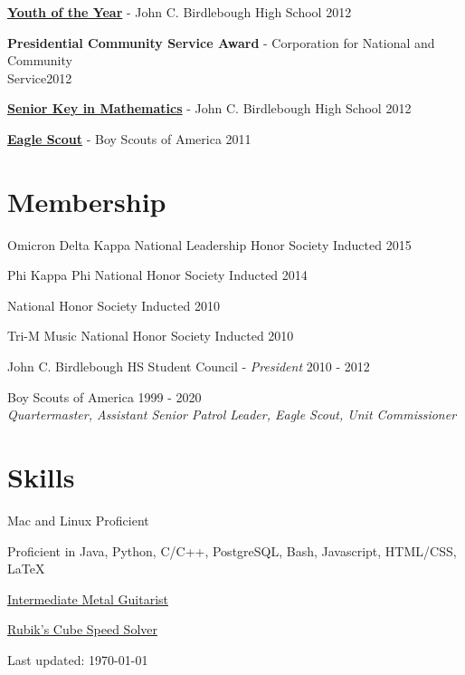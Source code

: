 \documentclass[8pt]{article}
\def\footerlink{}
\renewenvironment{itemize}{
  \begin{list}{}{
    \setlength{\leftmargin}{1.5em}
  }
}{
  \end{list}
}
\begin{document}
\begin{itemize}
\item \textbf{\href{http://www.oswegocountyweeklies.com/phoenix_register.php?details&story_id=5101&story_year=2012&story_month=5}{Youth of the Year}} - John C. Birdlebough High School \hfill 2012

\item \textbf{Presidential Community Service Award} - Corporation for National and Community \\Service\hfill 2012

\item \textbf{\href{http://www.oswegocountyweeklies.com/phoenix_register.php?details&story_id=5503&story_year=2012&story_month=6}{Senior Key in Mathematics}} - John C. Birdlebough High School \hfill 2012

\item \textbf{\href{http://www.oswegocountyweeklies.com/phoenix_register.php?details&story_id=6083&story_year=2012&story_month=8}{Eagle Scout}} - Boy Scouts of America \hfill 2011
\end{itemize}

\section*{Membership}
\begin{itemize}
\item Omicron Delta Kappa National Leadership Honor Society \hfill Inducted 2015
\item Phi Kappa Phi National Honor Society \hfill Inducted 2014
\item National Honor Society \hfill Inducted 2010
\item Tri-M Music National Honor Society \hfill Inducted 2010
\item John C. Birdlebough HS Student Council - \emph{President} \hfill 2010 - 2012
\item Boy Scouts of America \hfill 1999 - 2020\\
\emph{Quartermaster, Assistant Senior Patrol Leader, Eagle Scout, Unit Commissioner}
\end{itemize}

\section*{Skills}
\begin{itemize}
\item Mac and Linux Proficient
\item Proficient in Java, Python, C/C++, PostgreSQL, Bash, Javascript, HTML/CSS, {\LaTeX}
\item \href{https://youtube.com/shorts/u53k-L_dmuk?feature=share}{Intermediate Metal Guitarist}
\item \href{https://youtu.be/qPBg2xok04s}{Rubik's Cube Speed Solver}
\end{itemize}

\bigskip

\begin{center}
  \begin{footnotesize}
    Last updated: \today \\
    \href{\footerlink}{\texttt{\footerlink}}
  \end{footnotesize}
\end{center}
\end{document}
